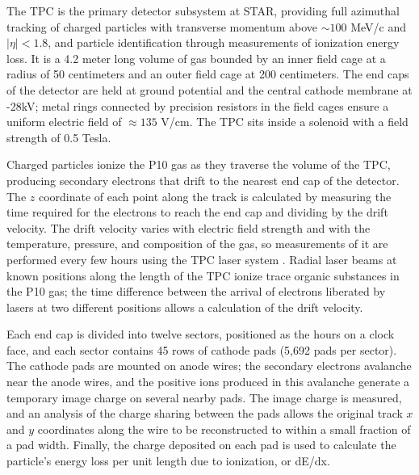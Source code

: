 The TPC \cite{Anderson:2003ur} is the primary detector subsystem at STAR, providing full azimuthal tracking of charged particles with transverse momentum above $\sim 100$ MeV/c and $|\eta| < 1.8$, and particle identification through measurements of ionization energy loss.  It is a 4.2 meter long volume of gas bounded by an inner field cage at a radius of 50 centimeters and an outer field cage at 200 centimeters.  The end caps of the detector are held at ground potential and the central cathode membrane at -28kV; metal rings connected by precision resistors in the field cages ensure a uniform electric field of $\approx 135$ V/cm.  The TPC sits inside a solenoid with a field strength of 0.5 Tesla.

Charged particles ionize the P10 gas as they traverse the volume of the TPC, producing secondary electrons that drift to the nearest end cap of the detector.  The $z$ coordinate of each point along the track is calculated by measuring the time required for the electrons to reach the end cap and dividing by the drift velocity.  The drift velocity varies with electric field strength and with the temperature, pressure, and composition of the gas, so measurements of it are performed every few hours using the TPC laser system \cite{Abele:2003aa}.  Radial laser beams at known positions along the length of the TPC ionize trace organic substances in the P10 gas; the time difference between the arrival of electrons liberated by lasers at two different positions allows a calculation of the drift velocity.

Each end cap is divided into twelve sectors, positioned as the hours on a clock face, and each sector contains 45 rows of cathode pads (5,692 pads per sector).  The cathode pads are mounted on anode wires; the secondary electrons avalanche near the anode wires, and the positive ions produced in this avalanche generate a temporary image charge on several nearby pads.  The image charge is measured, and an analysis of the charge sharing between the pads allows the original track $x$ and $y$ coordinates along the wire to be reconstructed to within a small fraction of a pad width.  Finally, the charge deposited on each pad is used to calculate the particle's energy loss per unit length due to ionization, or dE/dx.

